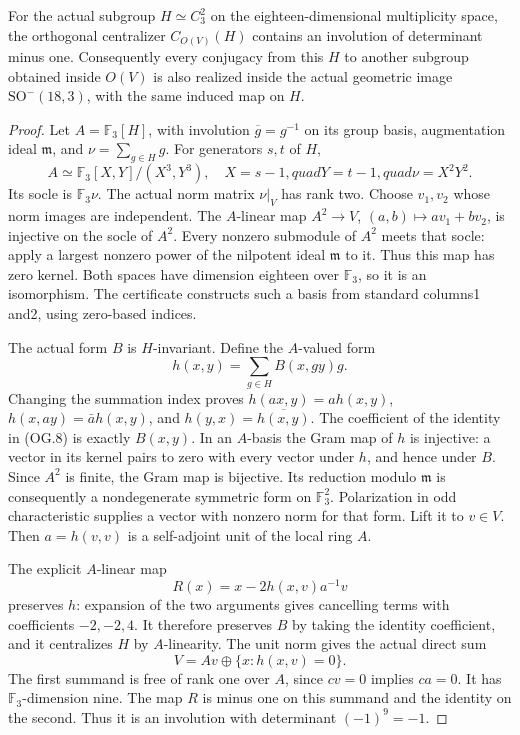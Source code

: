 \begin{lemma}
\label{lem:orthogonal-centralizer-determinant}
For the actual subgroup \(H\simeq C_3^2\)
on the eighteen-dimensional multiplicity space,
the orthogonal centralizer \(C_{O(V)}(H)\)
contains an involution of determinant minus one.
Consequently every conjugacy from this \(H\)
to another subgroup obtained inside \(O(V)\)
is also realized inside the actual geometric
image \(\mathrm{SO}^-(18,3)\), with the same
induced map on \(H\).
\end{lemma}
\begin{proof}
Let \(A=\mathbb F_3[H]\), with involution
\(\overline g=g^{-1}\) on its group basis,
augmentation ideal \(\mathfrak m\), and
\(\nu=\sum_{g\in H}g\).
For generators \(s,t\) of \(H\),
\[
 A\simeq\mathbb F_3[X,Y]/(X^3,Y^3),
 \quad X=s-1,quad Y=t-1,quad \nu=X^2Y^2.
 \tag{OG.7}
\]
Its socle is \(\mathbb F_3\nu\).
The actual norm matrix \(\nu|_V\) has rank
two. Choose \(v_1,v_2\) whose norm images
are independent. The \(A\)-linear map
\(A^2\to V\), \((a,b)\mapsto av_1+bv_2\),
is injective on the socle of \(A^2\).
Every nonzero submodule of \(A^2\) meets
that socle: apply a largest nonzero power
of the nilpotent ideal \(\mathfrak m\)
to it. Thus this map has zero kernel.
Both spaces have dimension eighteen over
\(\mathbb F_3\), so it is an isomorphism.
The certificate constructs such a basis
from standard columns1 and2, using zero-based
indices.

The actual form \(B\) is \(H\)-invariant.
Define the \(A\)-valued form
\[
 h(x,y)=\sum_{g\in H}B(x,gy)g.
 \tag{OG.8}
\]
Changing the summation index proves
\(h(ax,y)=a h(x,y)\),
\(h(x,ay)=\bar a h(x,y)\), and
\(h(y,x)=\overline{h(x,y)}\).
The coefficient of the identity in (OG.8)
is exactly \(B(x,y)\).
In an \(A\)-basis the Gram map of \(h\)
is injective: a vector in its kernel pairs
to zero with every vector under \(h\),
and hence under \(B\). Since \(A^2\) is
finite, the Gram map is bijective.
Its reduction modulo \(\mathfrak m\)
is consequently a nondegenerate symmetric
form on \(\mathbb F_3^2\).
Polarization in odd characteristic supplies
a vector with nonzero norm for that form.
Lift it to \(v\in V\). Then
\(a=h(v,v)\) is a self-adjoint unit of
the local ring \(A\).

The explicit \(A\)-linear map
\[
                R(x)=x-2h(x,v)a^{-1}v
 \tag{OG.9}
\]
preserves \(h\): expansion of the two
arguments gives cancelling terms with
coefficients \(-2,-2,4\).
It therefore preserves \(B\) by taking
the identity coefficient, and it centralizes
\(H\) by \(A\)-linearity.
The unit norm gives the actual direct sum
\[
 V=Av\oplus\{x:h(x,v)=0\}.
 \tag{OG.10}
\]
The first summand is free of rank one over
\(A\), since \(cv=0\) implies \(ca=0\).
It has \(\mathbb F_3\)-dimension nine.
The map \(R\) is minus one on this summand
and the identity on the second. Thus it
is an involution with determinant
\((-1)^9=-1\).


\end{proof}
